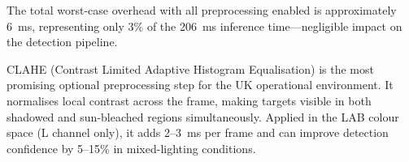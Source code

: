 The total worst-case overhead with all preprocessing enabled is approximately 6~ms,
representing only 3\% of the 206~ms inference time---negligible impact on the
detection pipeline.

CLAHE (Contrast Limited Adaptive Histogram Equalisation) is the most promising
optional preprocessing step for the UK operational environment. It normalises
local contrast across the frame, making targets visible in both shadowed and
sun-bleached regions simultaneously. Applied in the LAB colour space (L channel
only), it adds 2--3~ms per frame and can improve detection confidence by
5--15\% in mixed-lighting conditions.
